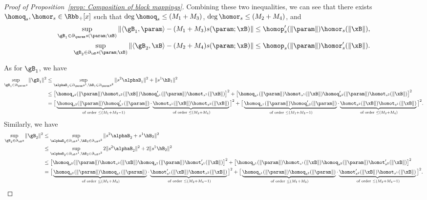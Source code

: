 \begin{proof}[Proof of Proposition~\ref{prop: Composition of block mappings}]
Combining these two inequalities, we can see that there exists $\homoq_s,\homor_s \in \Rbb_+[x]$ such that $\deg \homoq_s \le (M_1 +M_3)$, $\deg \homor_s \le (M_2+M_4)$, and 
\begin{align*}
    \sup_{\gB_1 \in \partial_{\param} s(\param;\xB)} \|\langle \gB_1 ,\param\rangle- (M_1 +M_3)s(\param;\xB)\| \le \homop_s^\prime (\|\param\|) \homor_s(\|\xB\|), \\ 
    \sup_{\gB_2 \in \partial_{\xB} s(\param;\xB)}\|\langle \gB_2 ,\xB\rangle- (M_2+M_4)s(\param;\xB)\| \le \homop_s (\|\param\|) \homor_s^\prime(\|\xB\|). 
 \end{align*}


As for $ \gB_1 $, we have 
\begin{align*}
\sup_{\gB_1 \in \partial_{\param}s} \|\gB_1\|^2  
&\le \sup_{\alphaB_1 \in \partial_{\param}s^1, \hB_1 \in \partial_{\param} s^2 } \|s^2 \alphaB_1 \|^2 + \|s^1 \hB_1\|^2 
\\ 
&\le \big[\homoq_{s^2}(\|\param\|) \homot_{s^2}(\|\xB\|) \homoq_{s^1}^\prime (\|\param\|) \homot_{s^1}(\|\xB\|)\big]^2 + \big[\homoq_{s^1}(\|\param\|) \homot_{s^1}(\|\xB\|) \homoq_{s^2}^\prime (\|\param\|) \homot_{s^2}(\|\xB\|)\big]^2 \\ 
&= \big[\underbrace{\homoq_{s^2}(\|\param\|)  \homoq_{s^1}^\prime (\|\param\|)}_{ \text{  of order } \le (M_1 +M_3-1)} \cdot \underbrace{ \homot_{s^1}(\|\xB\|)\homot_{s^2}(\|\xB\|)}_{\text{ of order }\le (M_2 + M_4)}\big]^2 + \big[\underbrace{\homoq_{s^1}(\|\param\|)  \homoq_{s^2}^\prime (\|\param\|)}_{ \text{  of order } \le (M_1 +M_3-1)} \cdot \underbrace{ \homot_{s^2}(\|\xB\|)\homot_{s^1}(\|\xB\|)}_{\text{ of order }\le (M_2 + M_4)}\big]^2. 
\end{align*}
Similarly, we have 
\begin{align*}
\sup_{\gB_2 \in \partial_{\xB}s} \|\gB_2\|^2  
&\le \sup_{\alphaB_2 \in \partial_{\xB}s^1, \hB_2 \in \partial_{\xB} s^2 } \|s^2 \alphaB_2 + s^1 \hB_2\|^2
\\
&\le \sup_{\alphaB_2 \in \partial_{\xB}s^1, \hB_2 \in \partial_{\xB} s^2 } 2\|s^2 \alphaB_2 \|^2 + 2\|s^1 \hB_2\|^2 
\\ 
&\le \big[\homoq_{s^2}(\|\param\|) \homot_{s^2}(\|\xB\|) \homoq_{s^1} (\|\param\|) \homot_{s^1}^\prime(\|\xB\|)\big]^2 + \big[\homoq_{s^1}(\|\param\|) \homot_{s^1}(\|\xB\|) \homoq_{s^2} (\|\param\|) \homot^\prime_{s^2}(\|\xB\|)\big]^2 \\ 
&= \big[\underbrace{\homoq_{s^2}(\|\param\|)  \homoq_{s^1} (\|\param\|)}_{ \text{  of order } \le (M_1 +M_3)} \cdot \underbrace{ \homot_{s^1}^\prime(\|\xB\|)\homot_{s^2}(\|\xB\|)}_{\text{ of order }\le (M_2 + M_4-1)}\big]^2 + \big[\underbrace{\homoq_{s^1}(\|\param\|)  \homoq_{s^2} (\|\param\|)}_{ \text{  of order } \le (M_1 +M_3)} \cdot \underbrace{ \homot_{s^2}^\prime(\|\xB\|)\homot_{s^1}(\|\xB\|)}_{\text{ of order }\le (M_2 + M_4-1)}\big]^2. 
\end{align*}


\end{proof}
